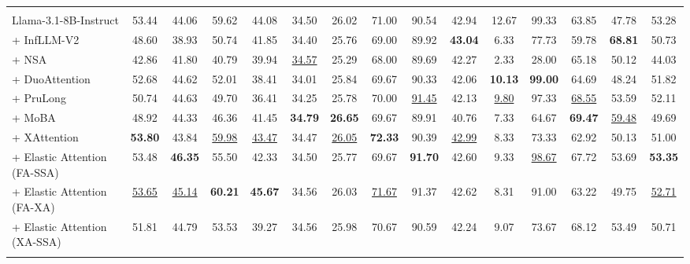 \begin{table}[t]
{\begin{tabular}{l|ccccccccccccc|c}
\arrayrulecolor{black}\midrule
\rowcolor{cyan!20}
\multicolumn{15}{c}{\textbf{Llama-3.1-8B-Instruct backbone model}} \\
\arrayrulecolor{black!20}\midrule
Llama-3.1-8B-Instruct & 53.44 & 44.06 & 59.62 & 44.08 & 34.50 & 26.02 & 71.00 & 90.54 & 42.94 & 12.67 & 99.33 & 63.85 & 47.78 & 53.28 \\
+ InfLLM-V2 & 48.60 & 38.93 & 50.74 & 41.85 & 34.40 & 25.76 & 69.00 & 89.92 & \textbf{43.04} & 6.33 & 77.73 & 59.78 & \textbf{68.81} & 50.73 \\
+ NSA & 42.86 & 41.80 & 40.79 & 39.94 & \underline{34.57} & 25.29 & 68.00 & 89.69 & 42.27 & 2.33 & 28.00 & 65.18 & 50.12 & 44.03 \\
+ DuoAttention & 52.68 & 44.62 & 52.01 & 38.41 & 34.01 & 25.84 & 69.67 & 90.33 & 42.06 & \textbf{10.13} & \textbf{99.00} & 64.69 & 48.24 & 51.82 \\
+ PruLong & 50.74 & 44.63 & 49.70 & 36.41 & 34.25 & 25.78 & 70.00 & \underline{91.45} & 42.13 & \underline{9.80} & 97.33 & \underline{68.55} & 53.59 & 52.11 \\
+ MoBA & 48.92 & 44.33 & 46.36 & 41.45 & \textbf{34.79} & \textbf{26.65} & 69.67 & 89.91 & 40.76 & 7.33 & 64.67 & \textbf{69.47} & \underline{59.48} & 49.69 \\
+ XAttention & \textbf{53.80} & 43.84 & \underline{59.98} & \underline{43.47} & 34.47 & \underline{26.05} & \textbf{72.33} & 90.39 & \underline{42.99} & 8.33 & 73.33 & 62.92 & 50.13 & 51.00 \\
\arrayrulecolor{black!40}\midrule
+ Elastic Attention (FA-SSA) & 53.48 & \textbf{46.35} & 55.50 & 42.33 & 34.50 & 25.77 & 69.67 & \textbf{91.70} & 42.60 & 9.33 & \underline{98.67} & 67.72 & 53.69 & \textbf{53.35} \\
+ Elastic Attention (FA-XA) & \underline{53.65} & \underline{45.14} & \textbf{60.21} & \textbf{45.67} & 34.56 & 26.03 & \underline{71.67} & 91.37 & 42.62 & 8.31 & 91.00 & 63.22 & 49.75 & \underline{52.71} \\
+ Elastic Attention (XA-SSA) & 51.81 & 44.79 & 53.53 & 39.27 & 34.56 & 25.98 & 70.67 & 90.59 & 42.24 & 9.07 & 73.67 & 68.12 & 53.49 & 50.71 \\
\arrayrulecolor{black}\bottomrule
\end{tabular}
}
\label{tab:longbench_subtask_results}
\end{table}